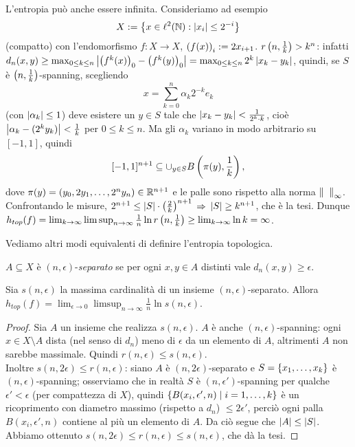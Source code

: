 \begin{esempio}L'entropia può anche essere infinita. Consideriamo ad esempio
\[ X:=\left\{x\in\ell^2(\mathbb{N}):\left|x_i\right|\le 2^{-i}\right\} \]
(compatto) con l'endomorfismo $f:X\to X$, $\left(f(x)\right)_i:=2x_{i+1}$. \Eacc $r\left(n,\frac{1}{k}\right)>k^n$:
infatti $d_n(x,y)\ge\max_{0\le k\le n}\left|\left(f^k(x)\right)_0-\left(f^k(y)\right)_0\right|=\max_{0\le k\le n}2^k\left|x_k-y_k\right|$,
quindi, se $S$ è $\left(n,\frac{1}{k}\right)$-spanning, scegliendo
\[ x=\sum_{k=0}^n\alpha_k 2^{-k}e_k \]
(con $\left|\alpha_k\right|\le 1$) deve esistere un $y\in S$ tale che $\left|x_k-y_k\right|<\frac{1}{2^k\cdot k}$,
cioè $\left|\alpha_k-(2^k y_k)\right|<\frac{1}{k}$ per $0\le k\le n$.
Ma gli $\alpha_k$ variano in modo arbitrario su $[-1,1]$, quindi
\[ [-1,1]^{n+1}\subseteq \cup_{y\in S}B\left(\pi(y),\frac{1}{k}\right), \]
dove $\pi(y)=(y_0,2y_1,\dots,2^n y_n)\in \mathbb{R}^{n+1}$ e le palle sono rispetto alla norma $\norm{\fantasma{a}}_\infty$.
Confrontando le misure, $2^{n+1}\le \left|S\right|\cdot\left(\frac{2}{k}\right)^{n+1}$ $\Rightarrow$ $\left|S\right|\ge k^{n+1}$, che è la tesi. 
Dunque $h_{top}(f)=\lim_{k\to\infty}\limsup_{n\to\infty}\frac{1}{n}\ln r\left(n,\frac{1}{k}\right)\ge\lim_{k\to\infty}\ln k=\infty$.
\end{esempio}

Vediamo altri modi equivalenti di definire l'entropia topologica.

\begin{defi}$A\subseteq X$ è $(n,\epsilon)$-\emph{separato} se per ogni $x,y\in A$ distinti
vale $d_n(x,y)\ge\epsilon$.
\end{defi}

\begin{prop}Sia $s(n,\epsilon)$ la massima cardinalità di un insieme $(n,\epsilon)$-separato.
Allora $h_{top}(f)=\lim_{\epsilon\to 0}\limsup_{n\to\infty}\frac{1}{n}\ln s(n,\epsilon)$.
\end{prop}

\begin{proof}Sia $A$ un insieme che realizza $s(n,\epsilon)$. $A$ è anche $(n,\epsilon)$-spanning:
ogni $x\in X\setminus A$ dista (nel senso di $d_n$) meno di $\epsilon$ da un elemento di $A$, altrimenti $A$
non sarebbe massimale. Quindi $r(n,\epsilon)\le s(n,\epsilon)$. \\
Inoltre $s(n,2\epsilon)\le r(n,\epsilon)$: siano $A$ è $(n,2\epsilon)$-separato
e $S=\left\{x_1,\dots,x_k\right\}$ è $(n,\epsilon)$-spanning; osserviamo che in realtà
$S$ è $(n,\epsilon')$-spanning per qualche $\epsilon'<\epsilon$ (per compattezza di $X$),
quindi $\left\{B(x_i,\epsilon',n)\mid i=1,\dots,k\right\}$ è un ricoprimento con diametro massimo (rispetto a $d_n$) $\le 2\epsilon'$,
perciò ogni palla $B(x_i,\epsilon',n)$ contiene al più un elemento di $A$.
Da ciò segue che $\left|A\right|\le\left|S\right|$. \\
Abbiamo ottenuto $s(n,2\epsilon)\le r(n,\epsilon)\le s(n,\epsilon)$, che dà la tesi.
\end{proof}

